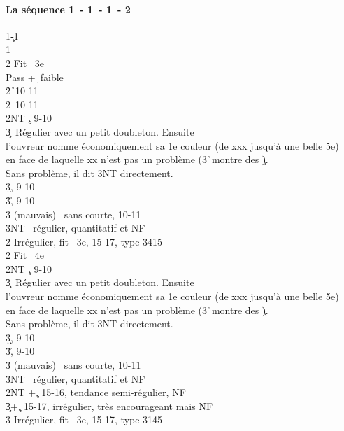 \documentclass[a4paper]{article}
\begin{document}
\paragraph{La séquence 1\pdfc\ - 1\pdfh\ - 1\pdfs\ - 2\pdfc}

\begin{bidtable}
1\c-1\h\\
1\c\\
2\d \> Fit \s\ 3e\+\\
Pass +\d\ faible\\
2\h {}\h\ 10-11\\
2\s {}\s\ 10-11\\
2NT \c , 9-10\\
3\c {}\s\ Régulier avec un petit doubleton. Ensuite\+\\
l'ouvreur \> nomme économiquement sa 1e couleur (de xxx jusqu'à une belle 5e)\\
en \> face de laquelle xx n'est pas un problème (3\h\ montre des \c ).\\
Sans \> problème, il dit 3NT directement.\-\\
3\d {}\d , 9-10\\
3\h {}\h , 9-10\\
3\s {} (mauvais) \s\ sans courte, 10-11\\
3NT \s\ régulier, quantitatif et NF\-\\
2\h \> Irrégulier, fit \s\ 3e, 15-17, type 3415\\
2\s \> Fit \s\ 4e\+\\
2NT \c , 9-10\\
3\c {}\s\ Régulier avec un petit doubleton. Ensuite\+\\
l'ouvreur \> nomme économiquement sa 1e couleur (de xxx jusqu'à une belle 5e)\\
en \> face de laquelle xx n'est pas un problème (3\h\ montre des \c ).\\
Sans \> problème, il dit 3NT directement.\-\\
3\d {}\d , 9-10\\
3\h {}\h , 9-10\\
3\s {} (mauvais) \s\ sans courte, 10-11\\
3NT \s\ régulier, quantitatif et NF\-\\
2NT +\c , 15-16, tendance semi-régulier, NF\\
3\c {}+\c , 15-17, irrégulier, très encourageant mais NF\\
3\d \> Irrégulier, fit \s\ 3e, 15-17, type 3145
\end{bidtable}
\end{document}
